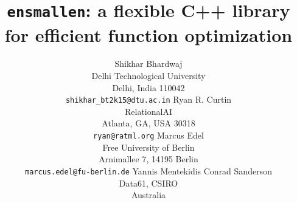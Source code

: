 \documentclass{article}
\begin{document}
\title{\texttt{ensmallen}: a flexible C++ library for efficient function optimization}

\author{Shikhar Bhardwaj \\
Delhi Technological University \\
Delhi, India 110042 \\
\texttt{shikhar\_bt2k15@dtu.ac.in}
\And
Ryan R. Curtin \\
RelationalAI \\
Atlanta, GA, USA 30318 \\
\texttt{ryan@ratml.org}
\And
Marcus Edel \\
Free University of Berlin \\
Arnimallee 7, 14195 Berlin \\
\texttt{marcus.edel@fu-berlin.de}
\And
Yannis Mentekidis
\And
Conrad Sanderson \\
Data61, CSIRO \\
Australia
}

\maketitle
\end{document}
